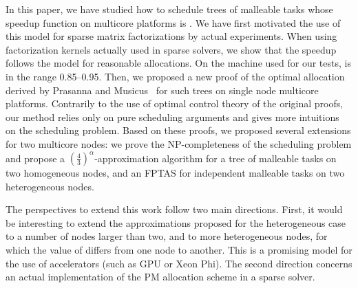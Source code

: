 \documentclass{llncs}
\newcommand{\frtrd}{\ensuremath{\left(\frac{4}{3}\right)^\alpha}}
\begin{document}
In this paper, we have studied how to schedule trees of malleable
tasks whose speedup function on multicore platforms is . We
have first motivated the use of this model for sparse matrix
factorizations by actual experiments. When using factorization kernels
actually used in sparse solvers, we show that the speedup follows the
 model for reasonable allocations. On the machine used for
our tests,  is in the range 0.85--0.95. Then, we proposed a
new proof of the optimal allocation derived by Prasanna and
Musicus~\cite{prasmus,prasmus2} for such trees on single node
multicore platforms. Contrarily to the use of optimal control theory
of the original proofs, our method relies only on pure scheduling
arguments and gives more intuitions on the scheduling problem. Based
on these proofs, we proposed several extensions for two multicore
nodes: we prove the NP-completeness of the scheduling problem and propose
a \frtrd-approximation algorithm for a tree of malleable tasks on two
homogeneous nodes, and an FPTAS for independent malleable tasks on two
heterogeneous nodes. 



The perspectives to extend this work follow two main
directions. First, it would be interesting to extend the
approximations proposed for the heterogeneous case to a number of nodes
larger than two, and to more heterogeneous nodes, for which the value
of  differs from one node to another. This is a promising
model for the use of accelerators (such as GPU or Xeon Phi). The
second direction concerns an actual implementation of the PM
allocation scheme in a sparse solver. 




\end{document}
